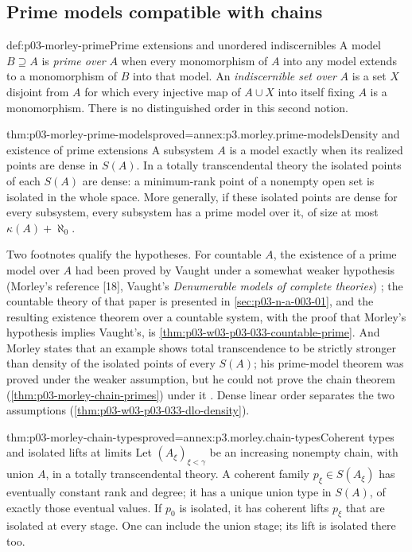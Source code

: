 \subsection{Prime models compatible with chains}
\label{sec:p03-morley-prime-chains}

\begin{hbdefinition}{def:p03-morley-prime}{Prime extensions and unordered indiscernibles}
A model \(B\supseteq A\) is \emph{prime over} \(A\) when every
monomorphism of \(A\) into any model extends to a monomorphism of
\(B\) into that model. An \emph{indiscernible set over} \(A\)
is a set \(X\) disjoint from \(A\) for which every injective map
of \(A\cup X\) into itself fixing \(A\) is a monomorphism.
There is no distinguished order in this second notion.
\end{hbdefinition}

\begin{hbtheorem}{thm:p03-morley-prime-models}{proved=annex:p3.morley.prime-models}{Density and existence of prime extensions}
A subsystem \(A\) is a model exactly when its realized points
are dense in \(S(A)\). In a totally transcendental theory the
isolated points of each \(S(A)\) are dense: a minimum-rank point
of a nonempty open set is isolated in the whole space.
More generally, if these isolated points are dense for every
subsystem, every subsystem has a prime model over it, of size at
most \(\kappa(A)+\aleph_0\).
\end{hbtheorem}

Two footnotes qualify the hypotheses. For countable \(A\), the existence
of a prime model over \(A\) had been proved by Vaught under a somewhat
weaker hypothesis (Morley's reference [18], Vaught's
\emph{Denumerable models of complete theories})
\cite[p.~530, n.~20]{Morley1965}; the countable theory of that paper is
presented in \cref{sec:p03-n-a-003-01}, and the resulting existence
theorem over a countable system, with the proof that Morley's hypothesis
implies Vaught's, is \cref{thm:p03-w03-p03-033-countable-prime}. And Morley states that an example
shows total transcendence to be strictly stronger than density of the
isolated points of every \(S(A)\); his prime-model theorem was proved
under the weaker assumption, but he could not prove the chain theorem
(\cref{thm:p03-morley-chain-primes}) under it
\cite[p.~532, n.~21]{Morley1965}. Dense linear order separates the two
assumptions (\cref{thm:p03-w03-p03-033-dlo-density}).

\begin{hblemma}{thm:p03-morley-chain-types}{proved=annex:p3.morley.chain-types}{Coherent types and isolated lifts at limits}
Let \((A_\xi)_{\xi<\gamma}\) be an increasing nonempty chain,
with union \(A\), in a totally transcendental theory. A coherent
family \(p_\xi\in S(A_\xi)\) has eventually constant rank and
degree; it has a unique union type in \(S(A)\), of exactly those
eventual values. If \(p_0\) is isolated, it has coherent lifts
\(p_\xi\) that are isolated at every stage. One can include the
union stage; its lift is isolated there too.
\end{hblemma}

